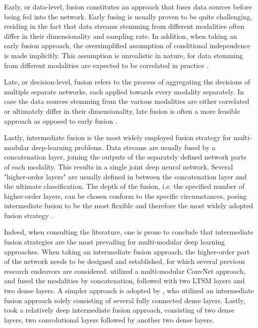 \documentclass[12pt]{article}
\begin{document}
Early, or data-level, fusion constitutes an approach that fuses data sources before being fed into the network. Early fusing is usually proven to be quite challenging, residing in the fact that data streams stemming from different modalities often differ in their dimensionality and sampling rate. In addition, when taking an early fusion approach, the oversimplified assumption of conditional independence is made implicitly. This assumption is unrealistic in nature, for data stemming from different modalities are expected to be correlated in practice \cite{ramachandram2017deep}. 

Late, or decision-level, fusion refers to the process of aggregating the decisions of multiple separate networks, each applied towards every modality separately. In case the data sources stemming from the various modalities are either correlated or ultimately differ in their dimensionality, late fusion is often a more feasible approach as opposed to early fusion \cite{ramachandram2017deep}.

Lastly, intermediate fusion is the most widely employed fusion strategy for multi-modular deep-learning problems. Data streams are usually fused by a concatenation layer, joining the outputs of the separately defined network parts of each modality. This results in a single joint deep neural network. Several "higher-order layers" are usually defined in between the concatenation layer and the ultimate classification. The depth of the fusion, i.e. the specified number of higher-order layers, can be chosen conform to the specific circumstances, posing intermediate fusion to be the most flexible and therefore the most widely adopted fusion strategy \cite{ramachandram2017deep}.

Indeed, when consulting the literature, one is prone to conclude that intermediate fusion strategies are the most prevailing for multi-modular deep learning approaches. When taking an intermediate fusion approach, the higher-order part of the network needs to be designed and established, for which several previous research endeavors are considered.   utilized a multi-modular ConvNet approach, and fused the modalities by concatenation, followed with two LTSM layers and two dense layers. A simpler approach is adopted by , who utilized an intermediate fusion approach solely consisting of several fully connected dense layers. Lastly,  took a relatively deep intermediate fusion approach, consisting of two dense layers, two convolutional layers followed by another two dense layers.  
\end{document}
